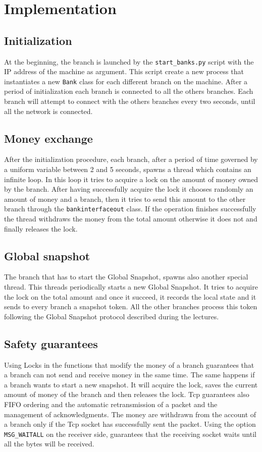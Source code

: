 \documentclass{article}
\begin{document}
\section{Implementation}
        \subsection{Initialization}
        At the beginning, the branch is launched by the \texttt{start\_banks.py} script with the IP address of the machine as argument.
        This script create a new process that instantiates a new \texttt{Bank} class for each different branch on the machine.
        After a period of initialization each branch is connected to all the others branches.
        Each branch will attempt to connect with the others branches every two seconds, until all the network is connected.
        \subsection{Money exchange}
            After the initialization procedure, each branch, after a period of time governed by a uniform variable between 2 and 5 seconds, spawns a thread which contains an infinite loop. In this loop it tries to acquire a lock on the amount of money owned by the branch. After having successfully acquire the lock it chooses randomly an amount of money and a branch, then it tries to send this amount to the other branch through the \texttt{bankinterfaceout} class. If the operation finishes successfully the thread withdraws the money from the total amount otherwise it does not and finally releases the lock.\\
        \subsection{Global snapshot}
        The branch that has to start the Global Snapshot, spawns also another special thread. This threads periodically starts a new Global Snapshot. It tries to acquire the lock on the total amount and once it succeed, it records the local state and it sends to every branch a snapshot token. All the other branches process this token following the Global Snapshot protocol described during the lectures.\\
    \subsection{Safety guarantees}
        Using Locks in the functions that modify the money of a branch guarantees that a branch can not send and receive money in the same time. The same happens if a branch wants to start a new snapshot. It will acquire the lock, saves the current amount of money of the branch and then releases the lock.
        Tcp guarantees also FIFO ordering and the automatic retransmission of a packet and the management of acknowledgments. The money are withdrawn from the account of a branch only if the Tcp socket has successfully sent the packet.
        Using the option \texttt{MSG\_WAITALL} on the receiver side, guarantees that the receiving socket waits until all the bytes will be received.
\end{document}
